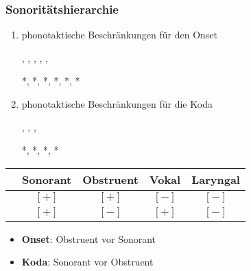 \begin{frame}
\frametitle{Sonoritätshierarchie}

\begin{enumerate}
	\item phonotaktische Beschränkungen für den Onset
	
          \ea
          , \textipa{[\alertred{pl}a:n]}, ,
          \textipa{[\alertred{fl}o:]}, \textipa{[\alertred{kn}i:]}, \textipa{[\alertred{gn}a:d@]}
          \z

          \ea
          *, *\textipa{[\alertred{lp}a:n]}, *, *\textipa{[\alertred{lf}o:]}, *\textipa{[\alertred{nk}i:]}, *\textipa{[\alertred{ng}a:d@]}
          \z

	\item phonotaktische Beschränkungen für die Koda

          \ea
          \textipa{[ka\alertred{lt}]}, \textipa{[ha\alertred{5t}]}, \textipa{[la\alertred{nt}]}, 
          \z

          \ea
          *\textipa{[ka\alertred{tl}]}, *, *\textipa{[la\alertred{tn}]}, *
          \z

\end{enumerate}
	

\begin{table}
\centering
\begin{tabular}{c|c|c|c|c} 
 & Sonorant & Obstruent & Vokal & Laryngal \\ 
\hline 
[kon] & $[+]$ & $[+]$ & $[-]$ & $[-]$ \\ 
\hline 
[son] & $[+]$ & $[-]$ & $[+]$ & $[-]$
\end{tabular} 

\end{table}

\begin{itemize}
	\item \textbf{Onset}: Obstruent vor Sonorant
	\item \textbf{Koda}: Sonorant vor Obstruent
\end{itemize}

\end{frame}



